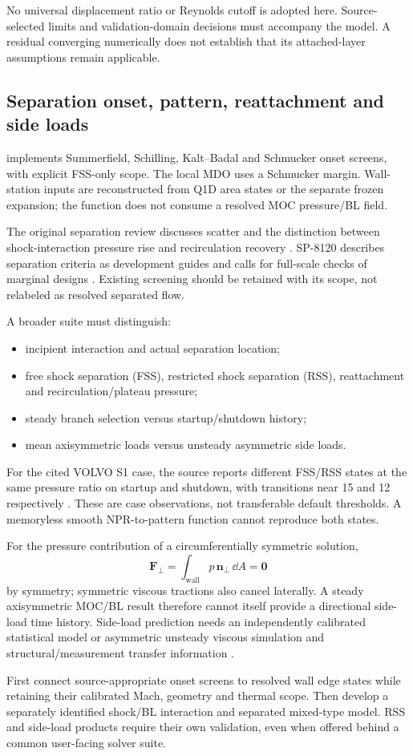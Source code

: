No universal displacement ratio or Reynolds cutoff is adopted here.
Source-selected limits and validation-domain decisions must accompany
the model. A residual converging numerically does not establish that
its attached-layer assumptions remain applicable.

\subsection{Separation onset, pattern, reattachment and side loads}
\current {} implements Summerfield, Schilling,
Kalt--Badal and Schmucker onset screens, with explicit FSS-only scope.
The local MDO uses a Schmucker margin. Wall-station inputs are reconstructed
from Q1D area states or the separate frozen expansion; the function does
not consume a resolved MOC pressure/BL field.

The original separation review discusses scatter and the distinction
between shock-interaction pressure rise and recirculation recovery
\cite[\S6.3.1, PDF pp.~51--52]{ostlund}. SP-8120 describes separation
criteria as development guides and calls for full-scale checks of
marginal designs \cite[PDF p.~82]{sp8120}. Existing screening should be
retained with its scope, not relabeled as resolved separated flow.

A broader suite must distinguish:
\begin{itemize}
\item incipient interaction and actual separation location;
\item free shock separation (FSS), restricted shock separation (RSS),
reattachment and recirculation/plateau pressure;
\item steady branch selection versus startup/shutdown history;
\item mean axisymmetric loads versus unsteady asymmetric side loads.
\end{itemize}
For the cited VOLVO S1 case, the source reports different FSS/RSS states
at the same pressure ratio on startup and shutdown, with transitions
near 15 and 12 respectively \cite[\S8.1.1, PDF p.~70]{ostlund}.
These are case observations, not transferable default thresholds.
A memoryless smooth NPR-to-pattern function cannot reproduce both states.

For the pressure contribution of a circumferentially symmetric solution,
\[
\mathbf F_\perp=\int_{\mathrm{wall}}p\,\mathbf n_\perp\,\dd A=\mathbf0
\]
by symmetry; symmetric viscous tractions also cancel laterally.
A steady axisymmetric MOC/BL result therefore cannot itself
provide a directional side-load time history. Side-load prediction needs
an independently calibrated statistical model or asymmetric unsteady
viscous simulation and structural/measurement transfer information
\cite[PDF pp.~70, 78--82]{ostlund}\cite[PDF p.~6]{frey}.

\proposal First connect source-appropriate onset screens to resolved wall
edge states while retaining their calibrated Mach, geometry and thermal
scope. Then develop a separately identified shock/BL interaction and
separated mixed-type model. RSS and side-load products require their own
validation, even when offered behind a common user-facing solver suite.
